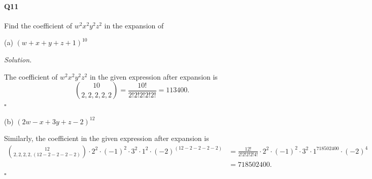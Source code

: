 \documentclass{report}
\begin{document}
 
\paragraph{Q11} Find the coefficient of $w^2x^2y^2z^2$ in the expansion of

\medskip \noindent
(a) $(w + x + y + z + 1)^{10}$

\medskip \noindent \textit{Solution.} 

\noindent
The coefficient of $w^2x^2y^2z^2$ in the given expression after expansion is 
\[\binom{10}{2,2,2,2,2} = \frac{10!}{2!2!2!2!2!}=113400.\]
\hfill $\square$

\noindent
(b) $(2w-x+3y+z-2)^{12}$

\noindent
Similarly, the coefficient in the given expression after expansion is
\begin{align*}
\binom{12}{2,2,2,2,(12-2-2-2-2)}
    \cdot2^2
    \cdot(-1)^2
    \cdot3^2
    \cdot1^2
    \cdot(-2)^{(12-2-2-2-2)}
&=\frac{12!}{2!2!2!2!4!}
\cdot2^2
\cdot(-1)^2
\cdot3^2
\cdot1^718502400
\cdot(-2)^4\\
&=718502400.
\end{align*}
\hfill $\square$
\end{document}
